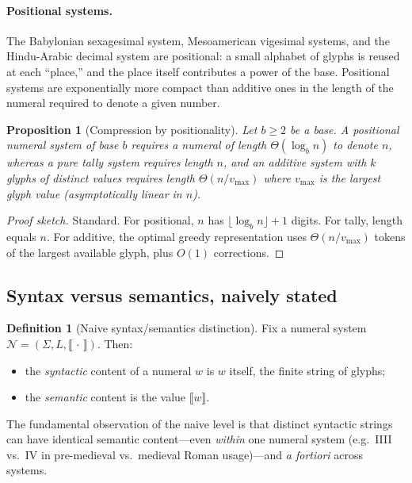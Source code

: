 \documentclass[12pt]{article}
\newtheorem{proposition}[theorem]{Proposition}
\theoremstyle{definition}
\newtheorem{definition}[theorem]{Definition}
\theoremstyle{remark}
\begin{document}
\paragraph{Positional systems.} The Babylonian sexagesimal system,
Mesoamerican vigesimal systems, and the Hindu-Arabic decimal system are
positional: a small alphabet of glyphs is reused at each ``place,'' and
the place itself contributes a power of the base. Positional systems are
exponentially more compact than additive ones in the length of the
numeral required to denote a given number.

\begin{proposition}[Compression by positionality]
\label{prop:positional-compression}
Let $b \geq 2$ be a base. A positional numeral system of base $b$ requires
a numeral of length $\Theta(\log_b n)$ to denote $n$, whereas a pure tally
system requires length $n$, and an additive system with $k$ glyphs of
distinct values requires length $\Theta(n / v_{\max})$ where $v_{\max}$
is the largest glyph value (asymptotically linear in $n$).
\end{proposition}

\begin{proof}[Proof sketch]
Standard. For positional, $n$ has $\lfloor \log_b n \rfloor + 1$ digits.
For tally, length equals $n$. For additive, the optimal greedy
representation uses $\Theta(n / v_{\max})$ tokens of the largest available
glyph, plus $O(1)$ corrections.
\end{proof}

\subsection{Syntax versus semantics, naively stated}

\begin{definition}[Naive syntax/semantics distinction]
\label{def:naive-ss}
Fix a numeral system $\mathcal{N} = (\Sigma, L, \llbracket\,\cdot\,\rrbracket)$.
Then:
\begin{itemize}
\item the \emph{syntactic} content of a numeral $w$ is $w$ itself, the
finite string of glyphs;
\item the \emph{semantic} content is the value $\llbracket w \rrbracket$.
\end{itemize}
The fundamental observation of the naive level is that distinct syntactic
strings can have identical semantic content---even \emph{within} one numeral
system (e.g.\ \textsf{IIII} vs.\ \textsf{IV} in pre-medieval vs.\ medieval
Roman usage)---and \emph{a fortiori} across systems.
\end{definition}
\end{document}
